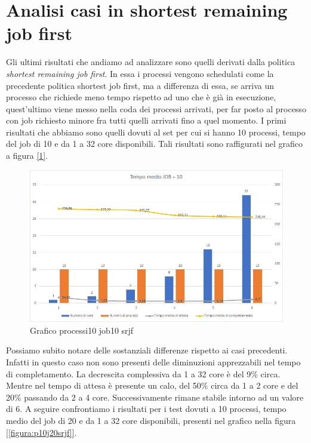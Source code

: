 \documentclass[Lau, oneside]{sapthesis}%
\begin{document}
\section{Analisi casi in shortest remaining job first}
\label{sec:analisiSRJF}
Gli ultimi risultati che andiamo ad analizzare sono quelli derivati dalla politica \textit{shortest remaining job first}.
In essa i processi vengono schedulati come la precedente politica shortest job first, ma a differenza di essa, se arriva un processo che richiede meno tempo rispetto ad uno che è già in esecuzione, quest'ultimo viene messo nella coda dei processi arrivati, per far posto al processo con job richiesto minore fra tutti quelli arrivati fino a quel momento.
I primi risultati che abbiamo sono quelli dovuti al set per cui si hanno 10 processi, tempo del job di 10 e da 1 a 32 core disponibili.
Tali risultati sono raffigurati nel grafico a figura \hyperref[figura:p10j10srjf]{[\ref*{figura:p10j10srjf}]}.
\begin{figure}[ht!]
  \centering
  \includegraphics[width=1\textwidth]{Grafico processi10job10 srjf.jpg}
  \caption{Grafico processi10 job10 srjf}
  \label{figura:p10j10srjf}
\end{figure}
Possiamo subito notare delle sostanziali differenze rispetto ai casi precedenti.
Infatti in questo caso non sono presenti delle diminuzioni apprezzabili nel tempo di completamento.
La decrescita complessiva da 1 a 32 core è del 9\% circa.
Mentre nel tempo di attesa è presente un calo, del 50\% circa da 1 a 2 core e del 20\% passando da 2 a 4 core.
Successivamente rimane stabile intorno ad un valore di 6.
A seguire confrontiamo i risultati per i test dovuti a 10 processi, tempo medio del job di 20 e da 1 a 32 core disponibili, presenti nel grafico nella figura \hyperref[figura:p10j20srjf]{[\ref*{figura:p10j20srjf}]}.
\end{document}
